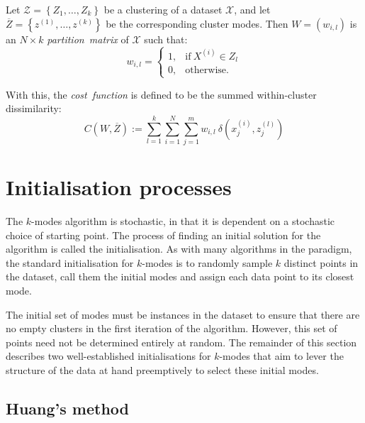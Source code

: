 \begin{definition}\label{def:cost}
    Let \(\mathcal{Z} = \left\{Z_1, \ldots, Z_k\right\}\) be a clustering of a
    dataset \(\mathcal{X}\), and let \(\overline Z = \left\{z^{(1)},
    \ldots, z^{(k)}\right\}\) be the corresponding cluster modes. Then \(W =
    \left(w_{i, l}\right)\) is an \(N \times k\) \emph{partition~matrix} of
    \(\mathcal{X}\) such that:
    \[
        w_{i, l} = \begin{cases}
                     1, & \text{if} \ X^{(i)} \in Z_l\\
                     0, & \text{otherwise.}
                   \end{cases}
    \]

    With this, the \emph{cost~function} is defined to be the summed
    within-cluster dissimilarity:
    \begin{equation}\label{eq:cost}
        C\left(W, \overline Z\right) := \sum_{l=1}^{k} \sum_{i=1}^{N}
        \sum_{j=1}^{m} w_{i,l} \ \delta\left(x_j^{(i)}, z_j^{(l)}\right)
    \end{equation}
\end{definition}



\section{Initialisation processes}\label{sec:inits}

The \(k\)-modes algorithm is stochastic, in that it is dependent on a stochastic
choice of starting point. The process of finding an initial solution for the
algorithm is called the initialisation. As with many algorithms in the paradigm,
the standard initialisation for \(k\)-modes is to randomly sample \(k\) distinct
points in the dataset, call them the initial modes and assign each data point to
its closest mode.

The initial set of modes must be instances in the dataset to ensure that there
are no empty clusters in the first iteration of the algorithm. However, this set
of points need not be determined entirely at random. The remainder of this
section describes two well-established initialisations for \(k\)-modes that aim
to lever the structure of the data at hand preemptively to select these initial
modes.

\subsection{Huang's method}\label{subsec:huang}

